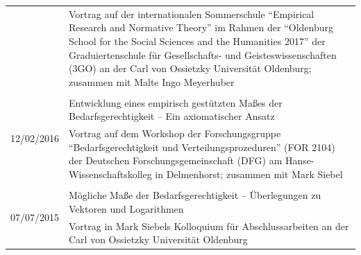 \documentclass[a4paper,10pt]{article}
\begin{document}
\begin{longtable}{p{2.5cm}p{11cm}}
& \footnotesize{Vortrag auf der internationalen Sommerschule \enquote{Empirical Research and Normative Theory} im Rahmen der \enquote{Oldenburg School for the Social Sciences and the Humanities 2017} der Graduiertenschule für Gesellschafts- und Geisteswissenschaften (3GO) an der Carl von Ossietzky Universität Oldenburg; zusammen mit Malte Ingo Meyerhuber}\\
\\
\multirow{2}{2.5cm}{\footnotesize{12/02/2016}} & Entwicklung eines empirisch gestützten Maßes der Bedarfsgerechtigkeit -- Ein axiomatischer Ansatz\\
& \footnotesize{Vortrag auf dem Workshop der Forschungsgruppe \enquote{Bedarfsgerechtigkeit und Verteilungsprozeduren} (FOR 2104) der Deutschen Forschungsgemeinschaft (DFG) am Hanse-Wissenschaftskolleg in Delmenhorst; zusammen mit Mark Siebel}\\
\\
\multirow{2}{2.5cm}{\footnotesize{07/07/2015}} & Mögliche Maße der Bedarfsgerechtigkeit -- Überlegungen zu Vektoren und Logarithmen\\
& \footnotesize{Vortrag in Mark Siebels Kolloquium für Abschlussarbeiten an der Carl von Ossietzky Universität Oldenburg}\\
\end{longtable}


\clearpage
\end{document}
